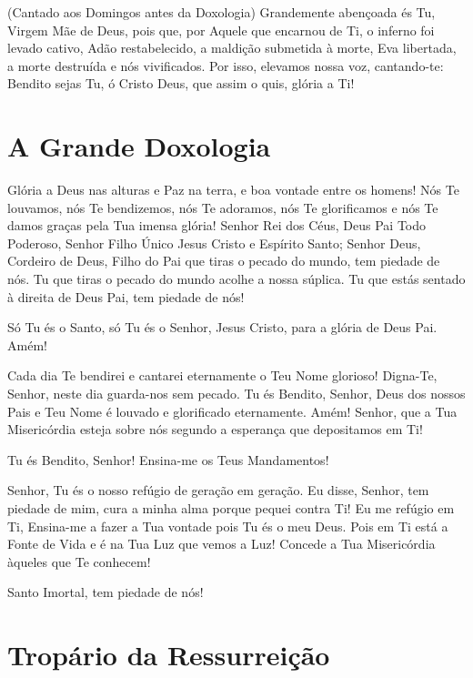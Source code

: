 \documentclass{subfiles}
\begin{document}
(Cantado aos Domingos antes da Doxologia)
Grandemente abençoada és Tu, Virgem Mãe de Deus, pois que, por
Aquele que encarnou de Ti, o inferno foi levado cativo, Adão restabelecido, a
maldição submetida à morte, Eva libertada, a morte destruída e nós
vivificados. Por isso, elevamos nossa voz, cantando-te: Bendito sejas Tu, ó
Cristo Deus, que assim o quis, glória a Ti!

\section*{A Grande Doxologia}

Glória a Deus nas alturas e Paz na terra, e boa vontade entre os
homens! Nós Te louvamos, nós Te bendizemos, nós Te adoramos, nós Te
glorificamos e nós Te damos graças pela Tua imensa glória!
Senhor Rei dos Céus, Deus Pai Todo Poderoso, Senhor Filho Único Jesus Cristo
e Espírito Santo; Senhor Deus, Cordeiro de Deus, Filho do Pai que tiras o
pecado do mundo, tem piedade de nós. Tu que tiras o pecado do mundo
acolhe a nossa súplica. Tu que estás sentado à direita de Deus Pai, tem piedade
de nós!

Só Tu és o Santo, só Tu és o Senhor, Jesus Cristo, para a glória de Deus Pai.
Amém!

Cada dia Te bendirei e cantarei eternamente o Teu Nome glorioso!
Digna-Te, Senhor, neste dia guarda-nos sem pecado. Tu és Bendito, Senhor,
Deus dos nossos Pais e Teu Nome é louvado e glorificado eternamente. Amém!
Senhor, que a Tua Misericórdia esteja sobre nós segundo a esperança que
depositamos em Ti!

Tu és Bendito, Senhor! Ensina-me os Teus Mandamentos! \thrice{}

Senhor,
Tu és o nosso refúgio de geração em geração. Eu disse, Senhor, tem piedade
de mim, cura a minha alma porque pequei contra Ti! Eu me refúgio em Ti,
Ensina-me a fazer a Tua vontade pois Tu és o meu Deus.
Pois em Ti está a Fonte de Vida e é na Tua Luz que vemos a Luz!
Concede a Tua Misericórdia àqueles que Te conhecem!

\trisagion{} \thrice{}

\Doxology{}

Santo Imortal, tem piedade de nós!

\trisagion{}


\section*{Tropário da Ressurreição}
\end{document}
